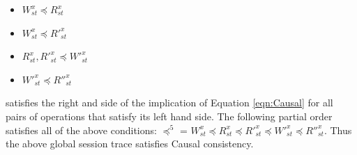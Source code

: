 \documentclass[journal,compsoc]{IEEEtran}
\begin{document}
\begin{itemize}

\item $W^x_{\mathit{st}}   \preccurlyeq R^x_{\mathit{st}} $
\item $W^x_{\mathit{st}}  \preccurlyeq R'^x_{\mathit{st}} $
\item $R^x_{\mathit{st}} ,  R'^x_{\mathit{st}}   \preccurlyeq W'^x_{\mathit{st}} $
\item $ W'^x_{\mathit{st}} \preccurlyeq R''^x_{\mathit{st}}$
\end{itemize}

\noindent satisfies the right and side of the implication of Equation \ref{eqn:Causal} for all pairs of operations that satisfy its left hand side. The following partial order satisfies all of the above conditions: $\preccurlyeq^5$ = $W^x_{\mathit{st}}   \preccurlyeq R^x_{\mathit{st}}  \preccurlyeq R'^x_{\mathit{st}}  \preccurlyeq  W'^x_{\mathit{st}}   \preccurlyeq R''^x_{\mathit{st}} $.  Thus the above  global session trace satisfies Causal consistency.
\end{document}

